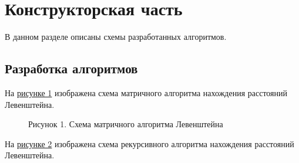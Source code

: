 \documentclass[12pt]{report}
\begin{document}
	\chapter{Конструкторская часть}
	В данном разделе описаны схемы разработанных алгоритмов.
	\section{Разработка алгоритмов}
	
	На \hyperref[picture_1]{рисунке 1} изображена схема матричного алгоритма нахождения расстояний Левенштейна.
	\begin{figure}[h!]\label{picture_1}
		\caption*{Рисунок 1. Схема матричного алгоритма Левенштейна}
	\end{figure}
	\newpage
	На \hyperref[picture_2]{рисунке 2} изображена схема рекурсивного алгоритма нахождения расстояний Левенштейна.
\end{document}
